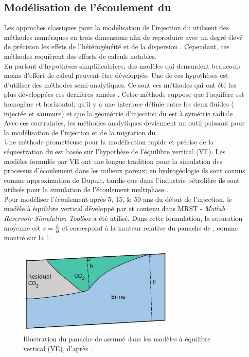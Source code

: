 \subsection{Modélisation de l'écoulement du \texorpdfstring{}{CO2}}
\label{sc:ecouelement}
Les approches classiques pour la modélisation de l'injection du 
utilisent
des méthodes numériques en trois dimensions afin de reproduire avec un degré
élevé de précision les effets de l'hétérogénéité et de la dispersion
\citep{White1997,Pruess1999,Pruess2004,Schlumberger2007}. Cependant, ces
méthodes requièrent des efforts de calculs notables.\\
En partant d'hypothèses simplificatrices, des modèles qui demandent beaucoup moins
d'effort de calcul peuvent être développés. Une de ces hypothèses est d'utiliser
des méthodes semi-analytiques. Ce sont ces méthodes qui ont été les plus développées ces
dernières années
\citep{Nordbotten2004,Nordbotten2005a,Nordbotten2005,Nordbotten2009}. Cette
méthode suppose que l’aquifère est homogène et horizontal, qu'il y a une
interface définie entre les deux fluides ( injectée et saumure) et que
la géométrie d'injection du  est à symétrie radiale \citep{Gasda2009}.
Avec ces contraintes, les méthodes analytiques deviennent un outil puissant pour
la modélisation de l'injection et de la migration du .\\
Une méthode prometteuse pour la modélisation rapide et précise de la
séquestration du  est basée sur l'hypothèse de l'équilibre vertical
(VE). Les modèles formulés par VE ont une longue tradition pour la simulation
des processus d'écoulement dans les milieux poreux; en hydrogéologie ils sont
connus comme approximation de Dupuit, tandis que dans l'industrie pétrolière ils
sont utilisés pour la simulation de l’écoulement multiphase
\citep{Martin1958,Coats1967,Martin1968}.\\
Pour modéliser l'écoulement après \numlist{5;15;50} ans du début de l'injection,
le modèle à équilibre vertical développé par \citet{Ligaarden2010} et contenu
dans MRST - \emph{Matlab Reservoir Simulation Toolbox} \citep{Lie2012} a été
utilisé. Dans cette formulation, la saturation moyenne est $s=\frac{h}{H}$ et
correspond à la hauteur relative du panache de , comme montré sur la
\cref{fig:VE}.
\begin{figure}[!ht]
\centering
\includegraphics[width=0.7\textwidth]{fig/VE.png}
\caption{Illustration du panache de  assumé dans les modèles à équilibre
vertical (VE), d'après \citet{Ligaarden2010}.}
\label{fig:VE}
\end{figure}
